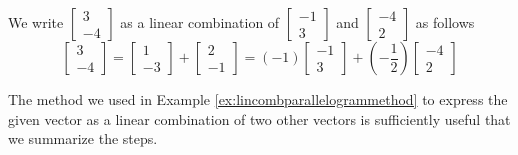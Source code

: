 \documentclass{ximera}
\begin{document}
\begin{example}
\begin{explanation}
We write $\begin{bmatrix}3\\-4\end{bmatrix}$ as a linear combination of $\begin{bmatrix}-1\\3\end{bmatrix}$ and $\begin{bmatrix}-4\\2\end{bmatrix}$ as follows
 $$\begin{bmatrix}3\\-4\end{bmatrix}=\begin{bmatrix}1\\-3\end{bmatrix}+\begin{bmatrix}2\\-1\end{bmatrix}=(-1)\begin{bmatrix}-1\\3\end{bmatrix}+\left(-\frac{1}{2}\right)\begin{bmatrix}-4\\2\end{bmatrix}$$
 
\end{explanation}
\end{example}

The method we used in Example \ref{ex:lincombparallelogrammethod} to express the given vector as a linear combination of two other vectors is sufficiently useful that we summarize the steps.
\end{document}
